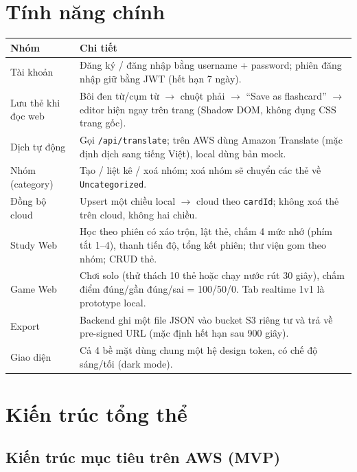 \documentclass[11pt,a4paper]{article}
\newcommand{\code}[1]{\texttt{#1}}
\begin{document}
\section{Tính năng chính}

\begin{longtable}{@{}p{3.4cm} p{11.8cm}@{}}
\toprule
\textbf{Nhóm} & \textbf{Chi tiết} \\
\midrule
\endhead
Tài khoản & Đăng ký / đăng nhập bằng username + password; phiên đăng nhập giữ bằng JWT (hết hạn 7 ngày). \\
\addlinespace
Lưu thẻ khi đọc web & Bôi đen từ/cụm từ $\rightarrow$ chuột phải $\rightarrow$ ``Save as flashcard'' $\rightarrow$ editor hiện ngay trên trang (Shadow DOM, không đụng CSS trang gốc). \\
\addlinespace
Dịch tự động & Gọi \code{/api/translate}; trên AWS dùng Amazon Translate (mặc định dịch sang tiếng Việt), local dùng bản mock. \\
\addlinespace
Nhóm (category) & Tạo / liệt kê / xoá nhóm; xoá nhóm sẽ chuyển các thẻ về \code{Uncategorized}. \\
\addlinespace
Đồng bộ cloud & Upsert một chiều local $\rightarrow$ cloud theo \code{cardId}; không xoá thẻ trên cloud, không hai chiều. \\
\addlinespace
Study Web & Học theo phiên có xáo trộn, lật thẻ, chấm 4 mức nhớ (phím tắt 1--4), thanh tiến độ, tổng kết phiên; thư viện gom theo nhóm; CRUD thẻ. \\
\addlinespace
Game Web & Chơi solo (thử thách 10 thẻ hoặc chạy nước rút 30 giây), chấm điểm đúng/gần đúng/sai = 100/50/0. Tab realtime 1v1 là prototype local. \\
\addlinespace
Export & Backend ghi một file JSON vào bucket S3 riêng tư và trả về pre-signed URL (mặc định hết hạn sau 900 giây). \\
\addlinespace
Giao diện & Cả 4 bề mặt dùng chung một hệ design token, có chế độ sáng/tối (dark mode). \\
\bottomrule
\end{longtable}

\section{Kiến trúc tổng thể}

\subsection{Kiến trúc mục tiêu trên AWS (MVP)}
\end{document}
